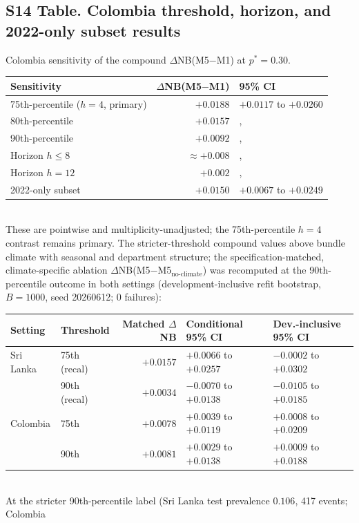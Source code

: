 \documentclass[11pt,a4paper]{article}
\begin{document}
\subsection*{S14 Table. Colombia threshold, horizon, and 2022-only subset results}
\noindent Colombia sensitivity of the compound $\Delta$NB(M5$-$M1) at $p^*=0.30$.\\[0.3em]
{\footnotesize\begin{tabular}{@{}lrl@{}}
\toprule
Sensitivity & $\Delta$NB(M5$-$M1) & 95\% CI \\
\midrule
75th-percentile ($h=4$, primary) & $+0.0188$ & $+0.0117$ to $+0.0260$ \\
80th-percentile & $+0.0157$ &, \\
90th-percentile & $+0.0092$ &, \\
Horizon $h\le 8$ & $\approx+0.008$ &, \\
Horizon $h=12$ & $+0.002$ &, \\
2022-only subset & $+0.0150$ & $+0.0067$ to $+0.0249$ \\
\bottomrule
\end{tabular}}\\[0.3em]
These are pointwise and multiplicity-unadjusted; the 75th-percentile $h=4$ contrast
remains primary. The stricter-threshold compound values above bundle climate with seasonal and
department structure; the specification-matched, climate-specific ablation
$\Delta$NB(M5$-$M5$_{\text{no-climate}}$) was recomputed at the 90th-percentile outcome in both
settings (development-inclusive refit bootstrap, $B=1000$, seed 20260612; 0 failures):\\[0.3em]
{\footnotesize\begin{tabular}{@{}llrll@{}}
\toprule
Setting & Threshold & Matched $\Delta$NB & Conditional 95\% CI & Dev.-inclusive 95\% CI \\
\midrule
Sri Lanka & 75th (recal) & $+0.0157$ & $+0.0066$ to $+0.0257$ & $-0.0002$ to $+0.0302$ \\
 & 90th (recal) & $+0.0034$ & $-0.0070$ to $+0.0138$ & $-0.0105$ to $+0.0185$ \\
Colombia & 75th & $+0.0078$ & $+0.0039$ to $+0.0119$ & $+0.0008$ to $+0.0209$ \\
 & 90th & $+0.0081$ & $+0.0029$ to $+0.0138$ & $+0.0009$ to $+0.0188$ \\
\bottomrule
\end{tabular}}\\[0.3em]
At the stricter 90th-percentile label (Sri Lanka test prevalence $0.106$, 417 events; Colombia
\end{document}
